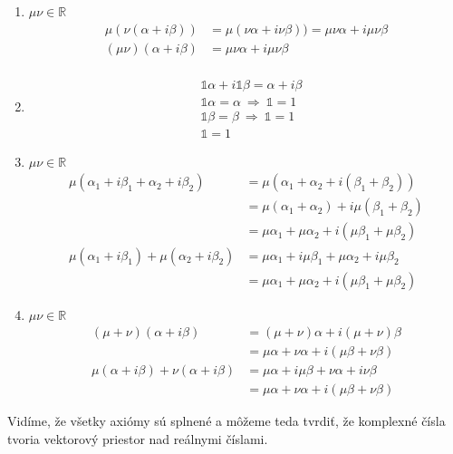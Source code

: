 \documentclass[a4paper, 10pt, ]{article}
\begin{document}
\begin{example}
\begin{enumerate}
        \item $\mu \nu \in \mathbb{R}$
        \begin{align*}
            \mu (\nu (\alpha + i \beta)) &= \mu (\nu \alpha + i \nu \beta)) = \mu \nu \alpha + i \mu \nu \beta \\
            (\mu \nu) (\alpha + i \beta) &= \mu \nu \alpha + i \mu \nu \beta \\
        \end{align*}

        \item
        \begin{align*}
            &\mathbb{1} \alpha + i \mathbb{1} \beta = \alpha + i \beta \\
            &\mathbb{1} \alpha = \alpha \ \Longrightarrow \ \mathbb{1} = 1 \\
            &\mathbb{1} \beta = \beta \ \Longrightarrow \ \mathbb{1} = 1 \\
            &\mathbb{1} = 1 
        \end{align*}

        \item $\mu \nu \in \mathbb{R}$
        \begin{align*}
            \mu (\alpha_1 + i \beta_1 + \alpha_2 + i\beta_2) &= 
            \mu (\alpha_1 + \alpha_2 + i (\beta_1 + \beta_2)) \\ &= 
            \mu(\alpha_1 + \alpha_2) + i \mu (\beta_1 + \beta_2) \\ & = 
            \mu \alpha_1 + \mu \alpha_2 + i (\mu \beta_1 + \mu \beta_2) \\ 
            \mu (\alpha_1 + i \beta_1) + \mu (\alpha_2 + i \beta_2) &= 
            \mu \alpha_1 + i \mu \beta_1 + \mu \alpha_2 + i \mu \beta_2 \\ &=
            \mu \alpha_1 + \mu \alpha_2 + i (\mu \beta_1 + \mu \beta_2)  
        \end{align*}

        \item $\mu \nu \in \mathbb{R}$
        \begin{align*}
            (\mu + \nu) (\alpha + i \beta) &= 
            (\mu + \nu) \alpha + i (\mu + \nu) \beta \\ &=
            \mu \alpha + \nu \alpha + i (\mu \beta + \nu \beta) \\
            \mu (\alpha + i \beta) + \nu (\alpha + i \beta) &= 
            \mu \alpha + i \mu \beta + \nu \alpha + i \nu \beta \\ &=
            \mu \alpha + \nu \alpha + i (\mu \beta + \nu \beta)  
        \end{align*}
    \end{enumerate}
    Vidíme, že všetky axiómy sú splnené a môžeme teda tvrdiť, že komplexné čísla tvoria vektorový priestor nad reálnymi číslami.
\end{example}
\end{document}

